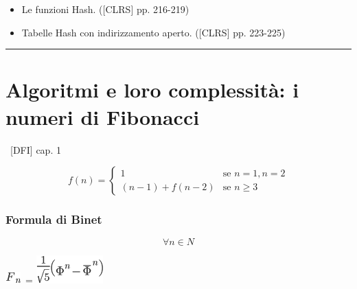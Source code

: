 \documentclass{article}
\providecommand{\tightlist}{%
  \setlength{\itemsep}{0pt}\setlength{\parskip}{0pt}}
\begin{document}
\begin{itemize}
\tightlist
\item
  {Le funzioni Hash. ({[}CLRS{]} pp. 216-219)}
\end{itemize}

\begin{itemize}
\tightlist
\item
  {Tabelle Hash con indirizzamento aperto. ({[}CLRS{]} pp. 223-225)}
\end{itemize}

{}

{}

\begin{center}\rule{0.5\linewidth}{\linethickness}\end{center}

\section{\texorpdfstring{{}}{}}\label{h.yttge93miuso}

\hypertarget{h.erye91slvrba}{\section{\texorpdfstring{{Algoritmi e loro
complessità: i numeri di Fibonacci
}}{Algoritmi e loro complessità: i numeri di Fibonacci }}\label{h.erye91slvrba}}

{~{[}DFI{]} cap. 1}

{}


\begin{equation}
f(n) = 
\begin{cases}
1 & \mbox{se } n=1,n=2 \\ 
(n-1)+f(n-2) & \mbox{se } n\geq3 
\end{cases}
\end{equation}

\hypertarget{h.uo8t8gg7vdaw}{\subsubsection{\texorpdfstring{{Formula di
Binet}}{Formula di Binet}}\label{h.uo8t8gg7vdaw}}

\begin{equation}
\forall n \in N
\end{equation}

\includegraphics{images/image1.png}{~=
}\includegraphics{images/image4.png}
\end{document}
